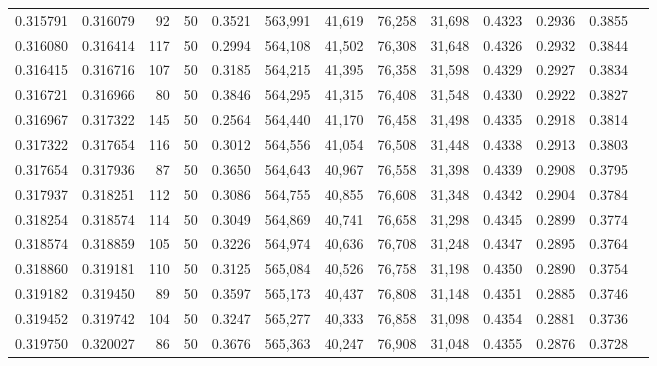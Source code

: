 \begin{tabular}{rrrrrrrrrrrrr}
0.315791 & 0.316079 &    92 &  50 &                                     0.3521 & 563,991 &  41,619 &  76,258 &  31,698 & 0.4323 & 0.2936 & 0.3855 \\
0.316080 & 0.316414 &   117 &  50 &                                     0.2994 & 564,108 &  41,502 &  76,308 &  31,648 & 0.4326 & 0.2932 & 0.3844 \\
0.316415 & 0.316716 &   107 &  50 &                                     0.3185 & 564,215 &  41,395 &  76,358 &  31,598 & 0.4329 & 0.2927 & 0.3834 \\
0.316721 & 0.316966 &    80 &  50 &                                     0.3846 & 564,295 &  41,315 &  76,408 &  31,548 & 0.4330 & 0.2922 & 0.3827 \\
0.316967 & 0.317322 &   145 &  50 &                                     0.2564 & 564,440 &  41,170 &  76,458 &  31,498 & 0.4335 & 0.2918 & 0.3814 \\
0.317322 & 0.317654 &   116 &  50 &                                     0.3012 & 564,556 &  41,054 &  76,508 &  31,448 & 0.4338 & 0.2913 & 0.3803 \\
0.317654 & 0.317936 &    87 &  50 &                                     0.3650 & 564,643 &  40,967 &  76,558 &  31,398 & 0.4339 & 0.2908 & 0.3795 \\
0.317937 & 0.318251 &   112 &  50 &                                     0.3086 & 564,755 &  40,855 &  76,608 &  31,348 & 0.4342 & 0.2904 & 0.3784 \\
0.318254 & 0.318574 &   114 &  50 &                                     0.3049 & 564,869 &  40,741 &  76,658 &  31,298 & 0.4345 & 0.2899 & 0.3774 \\
0.318574 & 0.318859 &   105 &  50 &                                     0.3226 & 564,974 &  40,636 &  76,708 &  31,248 & 0.4347 & 0.2895 & 0.3764 \\
0.318860 & 0.319181 &   110 &  50 &                                     0.3125 & 565,084 &  40,526 &  76,758 &  31,198 & 0.4350 & 0.2890 & 0.3754 \\
0.319182 & 0.319450 &    89 &  50 &                                     0.3597 & 565,173 &  40,437 &  76,808 &  31,148 & 0.4351 & 0.2885 & 0.3746 \\
0.319452 & 0.319742 &   104 &  50 &                                     0.3247 & 565,277 &  40,333 &  76,858 &  31,098 & 0.4354 & 0.2881 & 0.3736 \\
0.319750 & 0.320027 &    86 &  50 &                                     0.3676 & 565,363 &  40,247 &  76,908 &  31,048 & 0.4355 & 0.2876 & 0.3728 \\

\end{tabular}
